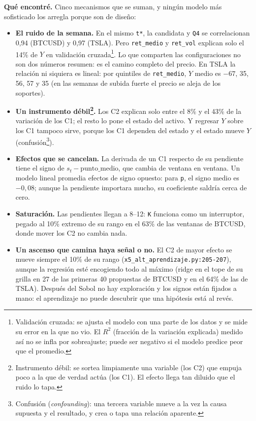 \documentclass[11pt,a4paper]{article}
\newcommand{\code}[1]{\texttt{\small #1}}
\begin{document}
\textbf{Qué encontré.} Cinco mecanismos que se suman, y ningún modelo más sofisticado los arregla porque
son de diseño:
\begin{itemize}[leftmargin=1.2em]
  \item \textbf{El ruido de la semana.} En el mismo \code{t*}, la candidata y \code{Q4} se correlacionan
        0,94 (BTCUSD) y 0,97 (TSLA). Pero \code{ret\_medio} y \code{ret\_vol} explican solo el 14\% de $Y$ en
        validación cruzada\footnote{Validación cruzada: se ajusta el modelo con una parte de los datos y se
        mide su error en la que no vio. El $R^2$ (fracción de la variación explicada) medido así no se
        infla por sobreajuste; puede ser negativo si el modelo predice peor que el promedio.}. Lo que
        comparten las configuraciones no son dos números resumen: es el camino completo del precio. En TSLA
        la relación ni siquiera es lineal: por quintiles de \code{ret\_medio}, $Y$ medio es $-67$, 35, 56,
        57 y 35 (en las semanas de subida fuerte el precio se aleja de los soportes).
  \item \textbf{Un instrumento débil\footnote{Instrumento débil: se sortea limpiamente una variable (los C2)
        que empuja poco a la que de verdad actúa (los C1). El efecto llega tan diluido que el ruido lo
        tapa.}.} Los C2 explican solo entre el 8\% y el 43\% de la variación de los C1; el resto lo pone el
        estado del activo. Y regresar $Y$ sobre los C1 tampoco sirve, porque los C1 dependen del estado y el
        estado mueve $Y$ (confusión\footnote{Confusión (\emph{confounding}): una tercera variable mueve a la
        vez la causa supuesta y el resultado, y crea o tapa una relación aparente.}).
  \item \textbf{Efectos que se cancelan.} La derivada de un C1 respecto de su pendiente tiene el signo de
        $s_t - \text{punto\_medio}$, que cambia de ventana en ventana. Un modelo lineal promedia efectos de
        signo opuesto: para \code{p}, el signo medio es $-0{,}08$; aunque la pendiente importara mucho, su
        coeficiente saldría cerca de cero.
  \item \textbf{Saturación.} Las pendientes llegan a 8--12: \code{K} funciona como un interruptor, pegado al
        10\% extremo de su rango en el 63\% de las ventanas de BTCUSD, donde mover los C2 no cambia nada.
  \item \textbf{Un ascenso que camina haya señal o no.} El C2 de mayor efecto se mueve siempre el 10\% de
        su rango (\code{x5\_alt\_aprendizaje.py:205-207}), aunque la regresión esté encogiendo todo al
        máximo (ridge en el tope de su grilla en 27 de las primeras 40 propuestas de BTCUSD y en el 64\% de
        las de TSLA). Después del Sobol no hay exploración y los signos están fijados a mano: el
        aprendizaje no puede descubrir que una hipótesis está al revés.
\end{itemize}
\end{document}
